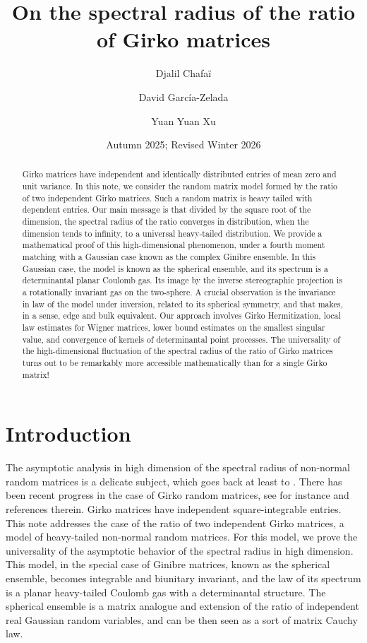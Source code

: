 \documentclass[10pt,reqno]{amsart}
\title{On the spectral radius of the ratio of Girko matrices}
\date{Autumn 2025; Revised Winter 2026}
\author{Djalil Chafaï}
\author{David García-Zelada}
\author{Yuan Yuan Xu}
\newcommand{\<}{\langle}
\renewcommand{\>}{\rangle}
\numberwithin{equation}{section}
\begin{document}
%
\begin{abstract} %
  Girko matrices have independent and identically distributed entries of mean zero and unit variance. In this note, we consider the random matrix model formed by the ratio of two independent Girko matrices. Such a random matrix is heavy tailed with dependent entries. Our main message is that divided by the square root of the dimension, the spectral radius of the ratio converges in distribution, when the dimension tends to infinity, to a universal heavy-tailed distribution. We provide 
  a mathematical proof of this high-dimensional phenomenon, under a fourth moment matching with a Gaussian case known as the complex Ginibre ensemble. In this Gaussian case, the model is known as the spherical ensemble, and its spectrum is a determinantal planar Coulomb gas. Its image by the inverse stereographic projection is a rotationally invariant gas on the two-sphere. 
  A crucial observation is the invariance in law of the model under inversion, related to its spherical symmetry, and that makes, in a sense, edge and bulk equivalent. Our approach involves Girko Hermitization, local law estimates for Wigner matrices, lower bound estimates on the smallest singular value, and convergence of kernels of determinantal point processes. The universality of the high-dimensional fluctuation of the spectral radius of the ratio of Girko matrices turns out to be remarkably more accessible mathematically than for a single Girko matrix!
\end{abstract}
%
\maketitle
%

{\footnotesize\tableofcontents}


\section{Introduction}

The asymptotic analysis in high dimension of the spectral radius of non-normal
random matrices is a delicate subject, which goes back at least to
\cite{zbMATH03864263,zbMATH03978046,zbMATH03940306,zbMATH02028588}. There has been recent progress in the case of
Girko random matrices, see for instance
\cite{MR4408512,MR4761213,cipolloni2024universalityextremaleigenvalueslarge,zbMATH07925435}
and references therein. Girko matrices have independent square-integrable
entries. This note addresses the case of the ratio of two independent Girko
matrices, a model of heavy-tailed non-normal random matrices.
For this model, we prove the universality of
the asymptotic behavior of the spectral radius in high dimension. This model,
in the special case of Ginibre matrices, known as the spherical ensemble,
becomes integrable and biunitary invariant, and the law of its spectrum is a
planar heavy-tailed Coulomb gas with a determinantal structure. The spherical
ensemble is a matrix analogue and extension of the ratio of independent real
Gaussian random variables, and can be then seen as a sort of matrix Cauchy law.
\end{document}

